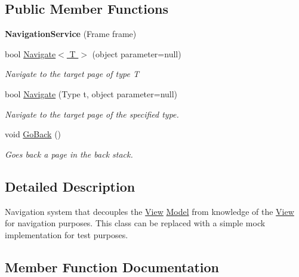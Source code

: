 \subsection*{Public Member Functions}
\begin{DoxyCompactItemize}
\item 
{\bfseries Navigation\+Service} (Frame frame)\hypertarget{class_listen_to_me_1_1_common_1_1_navigation_service_a8a665fd401d950a01ef3c91c9f606fac}{}\label{class_listen_to_me_1_1_common_1_1_navigation_service_a8a665fd401d950a01ef3c91c9f606fac}

\item 
bool \hyperlink{class_listen_to_me_1_1_common_1_1_navigation_service_a4d76df9d16965ff6693f58c1d0ecf968}{Navigate$<$ T $>$} (object parameter=null)
\begin{DoxyCompactList}\small\item\em Navigate to the target page of type T \end{DoxyCompactList}\item 
bool \hyperlink{class_listen_to_me_1_1_common_1_1_navigation_service_a53284996388b4695f9fa2e122295404e}{Navigate} (Type t, object parameter=null)
\begin{DoxyCompactList}\small\item\em Navigate to the target page of the specified type. \end{DoxyCompactList}\item 
void \hyperlink{class_listen_to_me_1_1_common_1_1_navigation_service_aefd6738e5756b8f18b08a4c64c0dd13a}{Go\+Back} ()
\begin{DoxyCompactList}\small\item\em Goes back a page in the back stack. \end{DoxyCompactList}\end{DoxyCompactItemize}


\subsection{Detailed Description}
Navigation system that decouples the \hyperlink{namespace_listen_to_me_1_1_view}{View} \hyperlink{namespace_listen_to_me_1_1_model}{Model} from knowledge of the \hyperlink{namespace_listen_to_me_1_1_view}{View} for navigation purposes. This class can be replaced with a simple mock implementation for test purposes. 



\subsection{Member Function Documentation}
